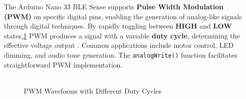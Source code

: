 The Arduino Nano 33 BLE Sense  supports \textbf{Pulse Width Modulation (PWM)} on specific digital pins, enabling the generation of analog-like signals through digital techniques. By rapidly toggling between \textbf{HIGH} and \textbf{LOW} states,\ref{fig:pwm_waveforms} PWM produces a signal with a variable \textbf{duty cycle}, determining the effective voltage output \cite{ArduinoPWM:2024}. Common applications include motor control, LED dimming, and audio tone generation. The \texttt{analogWrite()} function facilitates straightforward PWM implementation.
\\ \\
\vspace{1em} %
\begin{figure}[h!]
	\centering
	\caption{PWM Waveforms with Different Duty Cycles}
	\label{fig:pwm_waveforms}
\end{figure}

